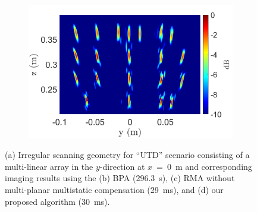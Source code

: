 \documentclass{ieeeaccess}
\begin{document}
\begin{figure}[h]
\begin{subfigure}[b]{0.23\textwidth}
         \caption{}
         \label{fig:sim1_UTD_RMA}
    \end{subfigure}
    \hfill
    \begin{subfigure}[b]{0.23\textwidth}
         \centering
         \includegraphics[width=\textwidth]{smith10.png}
         \caption{}
         \label{fig:sim1_UTD_RMA_FFH}
    \end{subfigure}
\caption{(a) Irregular scanning geometry for ``UTD'' scenario consisting of a multi-linear array in the $y$-direction at \mbox{$x$ = 0 m} and corresponding imaging results using the (b) BPA \mbox{(296.3 s)}, (c) RMA without multi-planar multistatic compensation \mbox{(29 ms)}, and (d) our proposed algorithm \mbox{(30 ms)}.}
\label{fig:sim1_UTD}
\end{figure}
\end{document}
